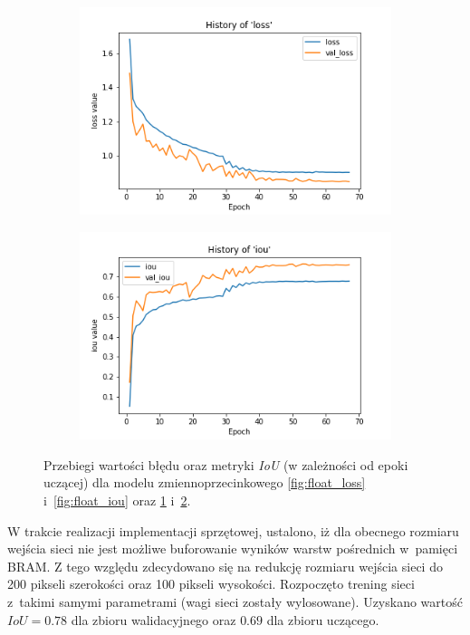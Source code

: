 \begin{figure}
\begin{subfigure}[b]{0.49\textwidth}
         \includegraphics[width=\textwidth]{images/8_bit_quant_hist_of_loss.png}
         \caption{}
         \label{fig:quant_loss}
     \end{subfigure}
     \hfill
     \begin{subfigure}[b]{0.49\textwidth}
         \centering
         \includegraphics[width=\textwidth]{images/8_bit_quant_hist_of_iou.png}
         \caption{}
         \label{fig:quant_iou}
     \end{subfigure}
     \hfill
     
    \caption{Przebiegi wartości błędu oraz metryki \emph{IoU} (w zależności od epoki uczącej) dla modelu zmiennoprzecinkowego \ref{fig:float_loss} i~\ref{fig:float_iou} oraz \ref{fig:quant_loss} i~\ref{fig:quant_iou}.}
    \label{fig:two_step_train}
\end{figure}


W trakcie realizacji implementacji sprzętowej, ustalono, iż dla obecnego rozmiaru wejścia sieci nie jest możliwe buforowanie wyników warstw pośrednich w~pamięci BRAM.
Z tego względu zdecydowano się na redukcję rozmiaru wejścia sieci do 200 pikseli szerokości oraz 100 pikseli wysokości. 
Rozpoczęto trening sieci z~takimi samymi parametrami (wagi sieci zostały wylosowane).  
Uzyskano wartość $IoU = 0.78$ dla zbioru walidacyjnego oraz $0.69$ dla zbioru uczącego.

